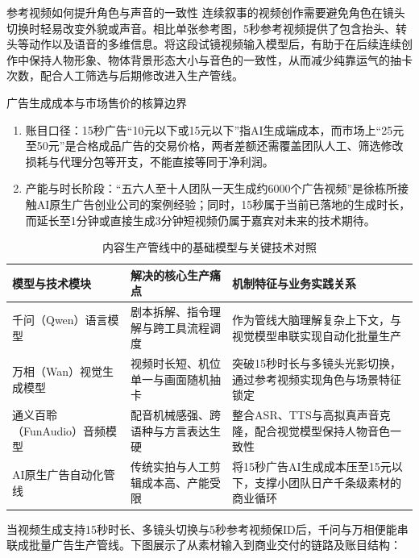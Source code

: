 \documentclass[UTF8,a4paper,11pt,fontset=fandol]{ctexart}
\begin{document}
\begin{importantbox}{参考视频如何提升角色与声音的一致性}
连续叙事的视频创作需要避免角色在镜头切换时轻易改变外貌或声音。相比单张参考图，5秒参考视频提供了包含抬头、转头等动作以及语音的多维信息。将这段试镜视频输入模型后，有助于在后续连续创作中保持人物形象、物体背景形态大小与音色的一致性，从而减少纯靠运气的抽卡次数，配合人工筛选与后期修改进入生产管线。
\end{importantbox}
\begin{warningbox}{广告生成成本与市场售价的核算边界}
\begin{enumerate}
\item 账目口径：15秒广告“10元以下或15元以下”指AI生成端成本，而市场上“25元至50元”是合格成品广告的交易价格，两者差额还需覆盖团队人工、筛选修改损耗与代理分包等开支，不能直接等同于净利润。
\item 产能与时长阶段：“五六人至十人团队一天生成约6000个广告视频”是徐栋所接触AI原生广告创业公司的案例经验；同时，15秒属于当前已落地的生成时长，而延长至1分钟或直接生成3分钟短视频仍属于嘉宾对未来的技术期待。
\end{enumerate}
\end{warningbox}
\begin{table}[H]\centering\small
\caption{内容生产管线中的基础模型与关键技术对照}
\begin{tabular}{>{\raggedright\arraybackslash}p{\dimexpr(\linewidth-6\tabcolsep)/3\relax}>{\raggedright\arraybackslash}p{\dimexpr(\linewidth-6\tabcolsep)/3\relax}>{\raggedright\arraybackslash}p{\dimexpr(\linewidth-6\tabcolsep)/3\relax}}
\toprule
模型与技术模块 & 解决的核心生产痛点 & 机制特征与业务实践关系\\\midrule
千问（Qwen）语言模型 & 剧本拆解、指令理解与跨工具流程调度 & 作为管线大脑理解复杂上下文，与视觉模型串联实现自动化批量生产\\[4pt]
万相（Wan）视觉生成模型 & 视频时长短、机位单一与画面随机抽卡 & 突破15秒时长与多镜头光影切换，通过参考视频实现角色与场景特征锁定\\[4pt]
通义百聆（FunAudio）音频模型 & 配音机械感强、跨语种与方言表达生硬 & 整合ASR、TTS与高拟真声音克隆，配合视觉模型保持人物音色一致性\\[4pt]
AI原生广告自动化管线 & 传统实拍与人工剪辑成本高、产能受限 & 将15秒广告AI生成成本压至15元以下，支撑小团队日产千条级素材的商业循环\\[4pt]
\bottomrule\end{tabular}\end{table}
当视频生成支持15秒时长、多镜头切换与5秒参考视频保ID后，千问与万相便能串联成批量广告生产管线。下图展示了从素材输入到商业交付的链路及账目结构：
\end{document}
